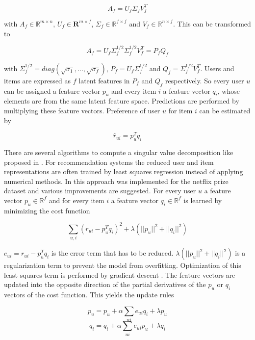 \documentclass[10pt]{reportMaster}
\begin{document}
$$
	A_f = U_f \Sigma_f V_f^T
$$

with $A_f \in \mathds{R}^{m \times n}$, $U_f \in \mathbf{R}^{m \times f}$, $\Sigma_f \in \mathds{R}^{f \times f}$ and $V_f \in \mathds{R}^{n \times f}$.
This can be transformed to 

$$
	A_f = U_f \Sigma_f^{1/2} \Sigma_f^{1/2} V_f^T = P_f Q_f
$$

with $\Sigma_f^{1/2} = diag(\sqrt{\sigma_1}, ..., \sqrt{\sigma_f})$, $P_f = U_f \Sigma_f^{1/2}$ and $Q_f = \Sigma_f^{1/2} V_f^T$.
Users and items are expressed as $f$ latent features in $P_f$ and $Q_f$ respectively.
So every user $u$ can be assigned a feature vector $p_u$ and every item $i$ a feature vector $q_i$, whose elements are from the same latent feature space.
Predictions are performed by multiplying these feature vectors.
Preference of user $u$ for item $i$ can be estimated by 

\begin{equation}
	\label{eq:linRegPrediction}
	\hat{r}_{ui} = p_u^T q_i
\end{equation}


There are several algorithms to compute a singular value decomposition like proposed in \cite{svdGolubSolution}.
For recommendation systems the reduced user and item representations are often trained by least squares regression instead of applying numerical methods.
In \cite{matrixFactorizationDifRegParam} this approach was implemented for the netflix prize dataset and various improvements are suggested.
For every user $u$ a feature vector $p_u \in \mathds{R}^f$ and for every item $i$ a feature vector $q_i \in \mathds{R}^f$ is learned by minimizing the cost function 

$$
	\sum_{u, i}{(r_{ui} - p_u^T q_i)^2 + \lambda (||p_u||^2 + ||q_i||^2)}
$$

$e_{ui} = r_{ui} - p_u^T q_i$ is the error term that has to be reduced.
$\lambda (||p_u||^2 + ||q_i||^2)$ is a regularization term to prevent the model from overfitting.
Optimization of this least squares term is performed by gradient descent \cite{ngRegressionLectureNotes}.
The feature vectors are updated into the opposite direction of the partial derivatives of the $p_u$ or $q_i$ vectors of the cost function.
This yields the update rules

\begin{equation}
\label{eq:updateLinRegP}
	p_u = p_u + \alpha \sum_{ui}{e_{ui} q_i + \lambda p_u}
\end{equation}
\begin{equation}
\label{eq:updateLinRegQ}
	q_i = q_i + \alpha \sum_{ui}{e_{ui} p_u + \lambda q_i}
\end{equation}
\end{document}
